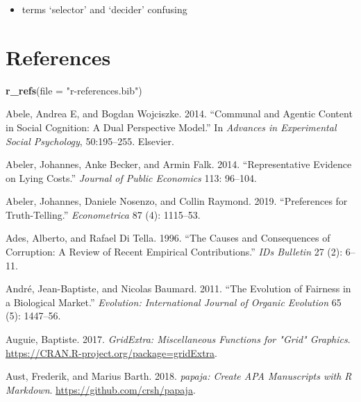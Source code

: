 \documentclass[man]{apa6}
\newenvironment{Shaded}{\begin{snugshade}}{\end{snugshade}}
\newcommand{\DataTypeTok}[1]{\textcolor[rgb]{0.13,0.29,0.53}{#1}}
\newcommand{\KeywordTok}[1]{\textcolor[rgb]{0.13,0.29,0.53}{\textbf{#1}}}
\newcommand{\NormalTok}[1]{#1}
\newcommand{\StringTok}[1]{\textcolor[rgb]{0.31,0.60,0.02}{#1}}
\providecommand{\tightlist}{%
  \setlength{\itemsep}{0pt}\setlength{\parskip}{0pt}}
\begin{document}
\begin{itemize}
\tightlist
\item
  terms `selector' and `decider' confusing
\end{itemize}

\newpage

\hypertarget{references}{%
\section{References}\label{references}}

\begin{Shaded}
\begin{Highlighting}[]
\KeywordTok{r_refs}\NormalTok{(}\DataTypeTok{file =} \StringTok{"r-references.bib"}\NormalTok{)}
\end{Highlighting}
\end{Shaded}

\begingroup
\setlength{\parindent}{-0.5in}
\setlength{\leftskip}{0.5in}

\hypertarget{refs}{}
\leavevmode\hypertarget{ref-abele2014communal}{}%
Abele, Andrea E, and Bogdan Wojciszke. 2014. ``Communal and Agentic
Content in Social Cognition: A Dual Perspective Model.'' In
\emph{Advances in Experimental Social Psychology}, 50:195--255.
Elsevier.

\leavevmode\hypertarget{ref-abeler2014representative}{}%
Abeler, Johannes, Anke Becker, and Armin Falk. 2014. ``Representative
Evidence on Lying Costs.'' \emph{Journal of Public Economics} 113:
96--104.

\leavevmode\hypertarget{ref-abeler2019preferences}{}%
Abeler, Johannes, Daniele Nosenzo, and Collin Raymond. 2019.
``Preferences for Truth-Telling.'' \emph{Econometrica} 87 (4): 1115--53.

\leavevmode\hypertarget{ref-ades1996causes}{}%
Ades, Alberto, and Rafael Di Tella. 1996. ``The Causes and Consequences
of Corruption: A Review of Recent Empirical Contributions.'' \emph{IDs
Bulletin} 27 (2): 6--11.

\leavevmode\hypertarget{ref-andre2011evolution}{}%
André, Jean-Baptiste, and Nicolas Baumard. 2011. ``The Evolution of
Fairness in a Biological Market.'' \emph{Evolution: International
Journal of Organic Evolution} 65 (5): 1447--56.

\leavevmode\hypertarget{ref-R-gridExtra}{}%
Auguie, Baptiste. 2017. \emph{GridExtra: Miscellaneous Functions for
"Grid" Graphics}. \url{https://CRAN.R-project.org/package=gridExtra}.

\leavevmode\hypertarget{ref-R-papaja}{}%
Aust, Frederik, and Marius Barth. 2018. \emph{papaja: Create APA
Manuscripts with R Markdown}. \url{https://github.com/crsh/papaja}.
\end{document}
